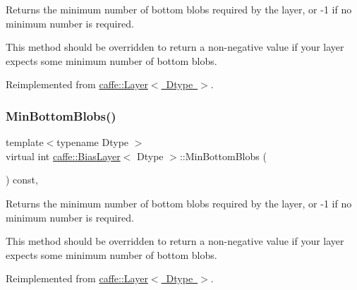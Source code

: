 Returns the minimum number of bottom blobs required by the layer, or -\/1 if no minimum number is required. 

This method should be overridden to return a non-\/negative value if your layer expects some minimum number of bottom blobs. 

Reimplemented from \mbox{\hyperlink{classcaffe_1_1_layer_aca3cb2bafaefda5d4760aaebd0b72def}{caffe\+::\+Layer$<$ Dtype $>$}}.

\mbox{\label{classcaffe_1_1_bias_layer_ab75a2e05bbb1eb37bed5995288143f67}} 
\subsubsection{\texorpdfstring{Min\+Bottom\+Blobs()}{MinBottomBlobs()}\hspace{0.1cm}{\footnotesize\ttfamily [2/2]}}
{\footnotesize\ttfamily template$<$typename Dtype $>$ \\
virtual int \mbox{\hyperlink{classcaffe_1_1_bias_layer}{caffe\+::\+Bias\+Layer}}$<$ Dtype $>$\+::Min\+Bottom\+Blobs (\begin{DoxyParamCaption}{ }\end{DoxyParamCaption}) const\hspace{0.3cm}{\ttfamily [inline]}, {\ttfamily [virtual]}}



Returns the minimum number of bottom blobs required by the layer, or -\/1 if no minimum number is required. 

This method should be overridden to return a non-\/negative value if your layer expects some minimum number of bottom blobs. 

Reimplemented from \mbox{\hyperlink{classcaffe_1_1_layer_aca3cb2bafaefda5d4760aaebd0b72def}{caffe\+::\+Layer$<$ Dtype $>$}}.

\mbox{\label{classcaffe_1_1_bias_layer_aff9bd5f76055189c5ec66f43faf17660}} 
